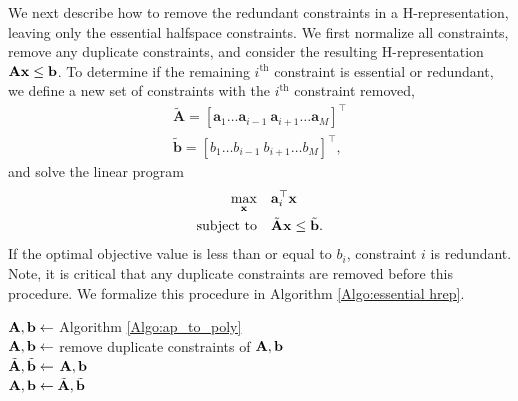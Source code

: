 We next describe how to remove the redundant constraints in a H-representation, leaving only the essential halfspace constraints. We first normalize all constraints, remove any duplicate constraints, and consider the resulting  H-representation $\mathbf{A}\mathbf{x} \le \mathbf{b}$. To determine if the remaining $i^{\text{th}}$ constraint is essential or redundant, we define a new set of constraints with the $i^{\text{th}}$ constraint removed,
\begin{subequations}
    \label{eq:pre-LP}
    \begin{align}
        \tilde{\mathbf{A}} = [\mathbf{a}_1 \ldots \mathbf{a}_{i-1}\ \mathbf{a}_{i+1} \ldots \mathbf{a}_M]^\top \\
         \tilde{\mathbf{b}} = [b_1 \ldots b_{i-1}\ b_{i+1} \ldots b_M]^\top,
    \end{align}
\end{subequations}
and solve the linear program
\begin{subequations}
    \label{eq:LP}
    \begin{align}
        \max_{\mathbf{x}} \quad & \mathbf{a}^{\top}_i \mathbf{x}\\
        \textrm{subject to} \quad & \tilde{\mathbf{A}}\mathbf{x} \le \tilde{\mathbf{b}}.
    \end{align}
\end{subequations}
If the optimal objective value is less than or equal to $b_i$, constraint $i$ is redundant. 
Note, it is critical that any duplicate constraints are removed before this procedure. We formalize this procedure in Algorithm \ref{Algo:essential hrep}.
\begin{algorithm}[h!]
\SetAlgoLined
\DontPrintSemicolon
 \KwIn{$\lambda$}
 \KwOut{$\bA, \bb$}
 $\mathbf{A}, \mathbf{b} \leftarrow$ Algorithm \ref{Algo:ap_to_poly} \\
 $\mathbf{A}, \mathbf{b} \leftarrow$ remove duplicate constraints of $\bA, \bb$  \\
 $\tilde{\mathbf{A}}, \tilde{\mathbf{b}} \leftarrow$ $\bA, \bb$  \\
$\mathbf{A}, \mathbf{b} \leftarrow \tilde{\mathbf{A}}, \tilde{\mathbf{b}}$ \\
\Return{$\bA, \bb$}
\caption{Essential H-representation}
\label{Algo:essential hrep}
\end{algorithm}

